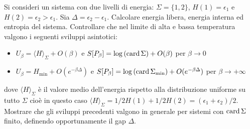 \begin{exercise}
    Si consideri un sistema con due livelli di energia: $ \Sigma = \{1, 2\} $, $ H(1) = \epsilon_1 $ e $ H(2) = \epsilon_2 > \epsilon_1 $. Sia $ \Delta = \epsilon_2 - \epsilon_1 $. Calcolare energia libera, energia interna ed entropia del sistema. Controllare che nel limite di alta e bassa temperatura valgono i seguenti sviluppi asintotici:
    \begin{itemize}
        \item $ U_\beta = \langle H\rangle_\Sigma + O(\beta) $ e $ S[P_\beta] = \log{(\operatorname{card}{\Sigma})} + O(\beta) $ per $ \beta \to 0 $
        \item $ U_\beta = H_{\mathrm{min}} + O(e^{-\beta \Delta}) $ e $ S[P_\beta] = \log{(\operatorname{card}{\Sigma_\mathrm{min}})} + O(e^{-\beta \Delta}) $ per $ \beta \to +\infty $
    \end{itemize}
    dove $ \langle H\rangle_\Sigma $ è il valore medio dell'energia rispetto alla distribuzione uniforme su tutto $ \Sigma $ cioè in questo caso $ \langle H\rangle_\Sigma = 1/2 H(1) + 1/2 H(2) = (\epsilon_1 + \epsilon_2)/2  $. Mostrare che gli sviluppi precedenti valgono in generale per sistemi con $ \operatorname{card}{\Sigma} $ finito, definendo opportunamente il gap $ \Delta $.
\end{exercise}
